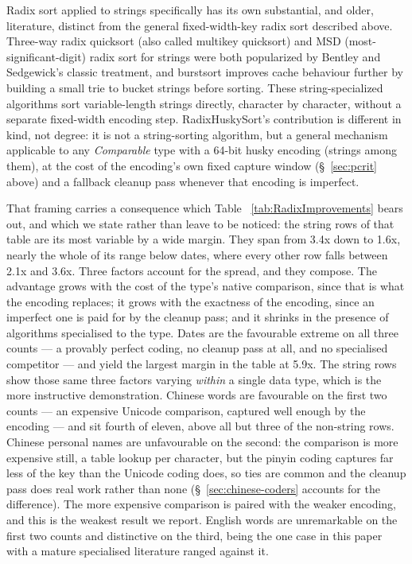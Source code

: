\documentclass[twoside,leqno,twocolumn]{article}
\begin{document}
Radix sort applied to strings specifically has its own substantial, and older, literature,
distinct from the general fixed-width-key radix sort described above.
Three-way radix quicksort (also called multikey quicksort) and MSD (most-significant-digit)
radix sort for strings were both popularized by Bentley and Sedgewick's classic treatment\cite{314161.314321},
and burstsort\cite{1064546.1180622} improves cache behaviour further by building a small trie to bucket strings before sorting.
These string-specialized algorithms sort variable-length strings directly, character by character, without a separate fixed-width encoding step.
RadixHuskySort's contribution is different in kind, not degree:
it is not a string-sorting algorithm, but a general mechanism applicable to any \textit{Comparable} type
with a 64-bit husky encoding (strings among them),
at the cost of the encoding's own fixed capture window (\S~\ref{sec:pcrit} above)
and a fallback cleanup pass whenever that encoding is imperfect.

That framing carries a consequence which Table ~\ref{tab:RadixImprovements} bears out,
and which we state rather than leave to be noticed:
the string rows of that table are its most variable by a wide margin.
They span from 3.4x down to 1.6x, nearly the whole of its range below dates,
where every other row falls between 2.1x and 3.6x.
Three factors account for the spread, and they compose.
The advantage grows with the cost of the type's native comparison, since that is what the encoding replaces;
it grows with the exactness of the encoding, since an imperfect one is paid for by the cleanup pass;
and it shrinks in the presence of algorithms specialised to the type.
Dates are the favourable extreme on all three counts --- a provably perfect coding, no cleanup pass at all,
and no specialised competitor --- and yield the largest margin in the table at 5.9x.
The string rows show those same three factors varying \emph{within} a single data type,
which is the more instructive demonstration.
Chinese words are favourable on the first two counts --- an expensive Unicode comparison,
captured well enough by the encoding --- and sit fourth of eleven, above all but three of the non-string rows.
Chinese personal names are unfavourable on the second: the comparison is more expensive still,
a table lookup per character, but the pinyin coding captures far less of the key than the Unicode
coding does, so ties are common and the cleanup pass does real work rather than none
(\S~\ref{sec:chinese-coders} accounts for the difference).
The more expensive comparison is paired with the weaker encoding, and this is the weakest result we report.
English words are unremarkable on the first two counts and distinctive on the third,
being the one case in this paper with a mature specialised literature ranged against it.
\end{document}
